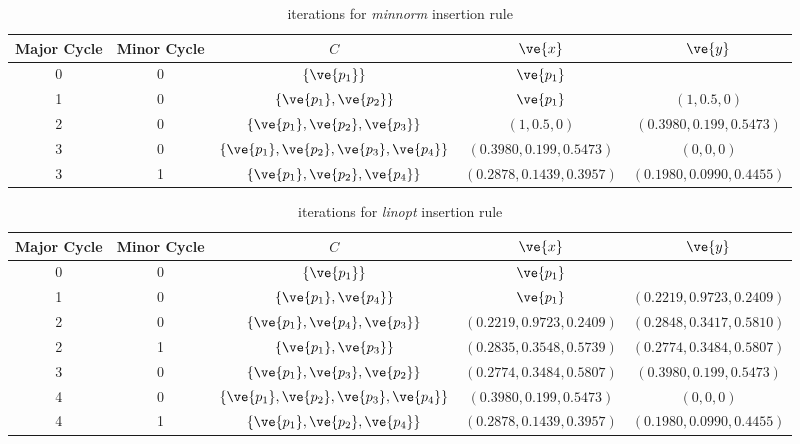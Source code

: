 \begin{table}
\centering
\begin{small}
\begin{tabular}{c c c c c}
	\toprule
	Major Cycle & Minor Cycle & $C$ & $\ve{x}$ & $\ve{y}$ \\ \midrule \midrule
	0 & 0 & $\{\ve{p_1}\}$ & $\ve{p_1}$ & \\ \midrule
	1 & 0 & $\{\ve{p_1},\ve{p_2}\}$ & $\ve{p_1}$ & $(1, 0.5,0)$ \\ \midrule
	2 & 0 & $\{\ve{p_1},\ve{p_2},\ve{p_3}\}$ & $(1,0.5,0)$ & $(0.3980,0.199,0.5473)$ \\ \midrule
	3 & 0 & $\{\ve{p_1},\ve{p_2},\ve{p_3},\ve{p_4}\}$ & $(0.3980,0.199,0.5473)$ & $(0,0,0)$ \\ \midrule
	3 & 1 & $\{\ve{p_1},\ve{p_2},\ve{p_4}\}$ & $(0.2878,0.1439,0.3957)$ & $(0.1980,0.0990,0.4455)$ \\ \bottomrule
\end{tabular}
\caption{iterations for \emph{minnorm} insertion rule}
\label{ex:1minnormsteps}
\end{small}
\end{table}

\begin{table}
\centering
\begin{small}
	\begin{tabular}{c c c c c}
		\toprule
		Major Cycle & Minor Cycle & $C$ & $\ve{x}$ & $\ve{y}$ \\ \midrule \midrule
		0 & 0 & $\{\ve{p_1}\}$ & $\ve{p_1}$ & \\ \midrule
		1 & 0 & $\{\ve{p_1},\ve{p_4}\}$ & $\ve{p_1}$ & $(0.2219,0.9723,0.2409)$ \\ \midrule
		2 & 0 & $\{\ve{p_1}, \ve{p_4},\ve{p_3}\}$ & $(0.2219,0.9723,0.2409)$ & $(0.2848,0.3417,0.5810)$ \\ \midrule
		2 & 1 & $\{\ve{p_1}, \ve{p_3}\}$ & $(0.2835, 0.3548,0.5739)$ & $(0.2774,0.3484,0.5807)$ \\ \midrule
		3 & 0 & $\{\ve{p_1},\ve{p_3},\ve{p_2}\}$ & $(0.2774,0.3484,0.5807)$ & $(0.3980,0.199,0.5473)$ \\ \midrule
		4 & 0 & $\{\ve{p_1},\ve{p_2},\ve{p_3},\ve{p_4}\}$ & $(0.3980,0.199,0.5473)$ & $(0,0,0)$ \\ \midrule
		4 & 1 & $\{\ve{p_1},\ve{p_2},\ve{p_4}\}$ & $(0.2878,0.1439,0.3957)$ & $(0.1980,0.0990,0.4455)$ \\ \bottomrule
	\end{tabular}
	\caption{iterations for \emph{linopt} insertion rule}
	\label{ex:1linoptsteps}
\end{small}
\end{table}

